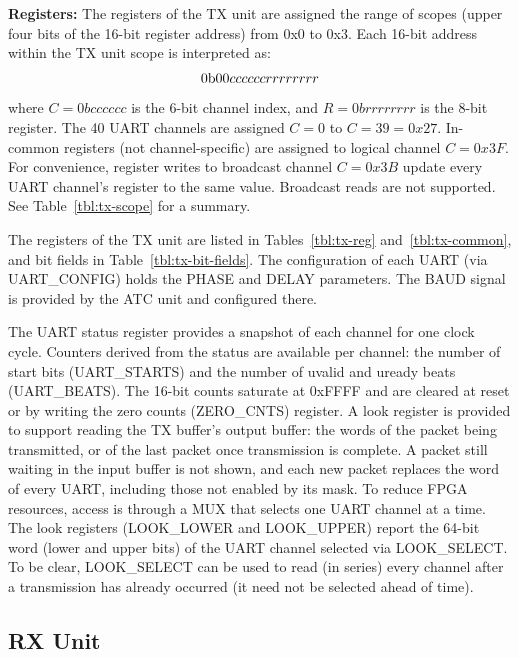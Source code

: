 \documentclass[12pt]{article}
\begin{document}
{\bf Registers:} The registers of the TX unit are assigned the range
of scopes (upper four bits of the 16-bit register address) from 0x0 to 0x3.  Each
16-bit address within the TX unit scope is interpreted as:
$${\rm 0b00}cc cccc rrrr rrrr$$ where $C=0bcc cccc$ is the 6-bit
channel index, and $R=0brrrr rrrr$ is the 8-bit register.  The 40 UART
channels are assigned $C=0$ to $C=39=0x27$.  In-common registers
(not channel-specific) are assigned to logical channel $C=0x3F$.  For
convenience, register writes to broadcast channel $C=0x3B$ update
every UART channel's register to the same value.  Broadcast reads are
not supported. See Table~\ref{tbl:tx-scope} for a summary.

The registers of the TX unit are listed in Tables~\ref{tbl:tx-reg}
and~\ref{tbl:tx-common}, and bit fields in Table~\ref{tbl:tx-bit-fields}.
The configuration of each UART (via
UART\_CONFIG) holds the PHASE and DELAY parameters.  The BAUD signal
is provided by the ATC unit and configured there.

The UART status register provides a snapshot of each channel for one
clock cycle.  Counters derived from the status are available per
channel: the number of start bits (UART\_STARTS) and the number of
uvalid and uready beats (UART\_BEATS).  The 16-bit counts saturate at
0xFFFF and are cleared at reset or by writing the zero counts
(ZERO\_CNTS) register.  A look register is provided to support reading
the TX buffer's output buffer:  the words of the packet being
transmitted, or of the last packet once transmission is complete.  A
packet still waiting in the input buffer is not shown, and each new
packet replaces the word of every UART, including those not enabled by
its mask.  To reduce FPGA resources, access is through a MUX that
selects one UART channel at a time.  The look registers (LOOK\_LOWER
and LOOK\_UPPER) report the 64-bit word (lower and upper bits) of the
UART channel selected via LOOK\_SELECT.  To be clear, LOOK\_SELECT can be used to
read (in series) every channel after a transmission has already
occurred (it need not be selected ahead of time).

\subsection{RX Unit}
\end{document}
